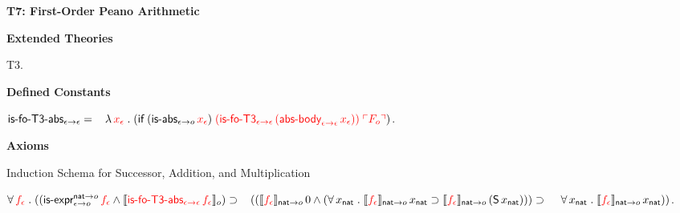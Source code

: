 \documentclass[fleqn,11pt]{article}
\begin{document}
    \ee

\ei

\noindent
\textbf{T7: First-Order Peano Arithmetic}

\bi

  \item[] \textbf{Extended Theories} 

  \be

    \setcounter{enumi}{2}

    \item T3.

  \ee

  \item[] \textbf{Defined Constants}

  \be

    \setcounter{enumi}{7}

    \item $\mbox{\sf is-fo-T3-abs}_{\epsilon \rightarrow \epsilon} = {}\\
    \hspace*{2ex}\lambda\, \textcolor{red}{x_\epsilon} \mathrel. 
    (\mbox{\sf if} \; (\mbox{\sf is-abs}_{\epsilon \rightarrow o} \, \textcolor{red}{x_\epsilon}) \;
    \textcolor{red}{(\mbox{\sf is-fo-T3}_{\epsilon \rightarrow \epsilon} \,
    (\mbox{\sf abs-body}_{\epsilon \rightarrow \epsilon} \, x_\epsilon))} \;
    \textcolor{red}{\ulcorner F_o\urcorner})$.

  \ee

  \item[] \textbf{Axioms}

  \be

    \setcounter{enumi}{32}

    \item Induction Schema for Successor, Addition, and Multiplication

    $\forall\, \textcolor{red}{f_\epsilon} \mathrel. 
    ((\mbox{\sf is-expr}_{\epsilon \rightarrow o}^{{\sf nat} \rightarrow o} \, \textcolor{red}{f_\epsilon} \wedge
    \llbracket\textcolor{red}{\mbox{\sf is-fo-T3-abs}_{\epsilon \rightarrow \epsilon} \, 
    f_\epsilon}\rrbracket_o) \supset {} \\
    \hspace*{2ex}((\llbracket\textcolor{red}{f_\epsilon}\rrbracket_{{\sf nat} \rightarrow o} \, 0 \wedge
    (\forall\, x_{\sf nat} \mathrel. 
    \llbracket\textcolor{red}{f_\epsilon}\rrbracket_{{\sf nat} \rightarrow o} \, x_{\sf nat} \supset
    \llbracket\textcolor{red}{f_\epsilon}\rrbracket_{{\sf nat} \rightarrow o} \, 
    (\mbox{\sf S} \, x_{\sf nat}))) \supset 
    \hspace*{2.8ex}\forall\, x_{\sf nat} \mathrel. 
    \llbracket\textcolor{red}{f_\epsilon}\rrbracket_{{\sf nat} \rightarrow o} \, x_{\sf nat}))$.

  \ee
\end{document}
